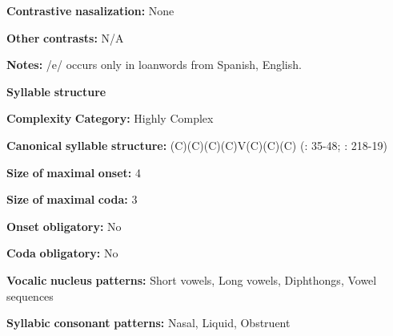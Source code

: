 \begin{styleBody}
\textbf{Contrastive} \textbf{nasalization:} None
\end{styleBody}

\begin{styleBody}
\textbf{Other} \textbf{contrasts:} N/A
\end{styleBody}

\begin{styleBody}
\textbf{Notes:} /e/ occurs only in loanwords from Spanish, English.
\end{styleBody}

\begin{styleBody}
\textbf{Syllable} \textbf{structure}
\end{styleBody}

\begin{styleBody}
\textbf{Complexity} \textbf{Category:} Highly Complex
\end{styleBody}

\begin{styleBody}
\textbf{Canonical} \textbf{syllable} \textbf{structure:} (C)(C)(C)(C)V(C)(C)(C) (\citealt{Crawford1966}: 35-48; \citealt{Bendixen1980}: 218-19)
\end{styleBody}

\begin{styleBody}
\textbf{Size} \textbf{of} \textbf{maximal} \textbf{onset:} 4
\end{styleBody}

\begin{styleBody}
\textbf{Size} \textbf{of} \textbf{maximal} \textbf{coda:} 3
\end{styleBody}

\begin{styleBody}
\textbf{Onset} \textbf{obligatory:} No
\end{styleBody}

\begin{styleBody}
\textbf{Coda} \textbf{obligatory:} No
\end{styleBody}

\begin{styleBody}
\textbf{Vocalic} \textbf{nucleus} \textbf{patterns:} Short vowels, Long vowels, Diphthongs, Vowel sequences
\end{styleBody}

\begin{styleBody}
\textbf{Syllabic} \textbf{consonant} \textbf{patterns:} Nasal, Liquid, Obstruent
\end{styleBody}

